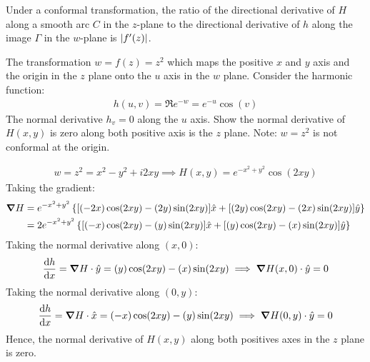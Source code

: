 \documentclass[12pt, english]{book}
\makeatletter
\renewenvironment{proof}[1][\proofname]{\par
	\pushQED{\qed}%
	\normalfont \topsep6\p@\@plus6\p@\relax
	\list{}{%
		\settowidth{\leftmargin}{\itshape\proofname:\hskip\labelsep}%
		\setlength{\labelwidth}{0pt}%
		\setlength{\itemindent}{-\leftmargin}%
		}%
	\item[\hskip\labelsep\itshape#1\@addpunct{:}]\ignorespaces
	}{\popQED\endlist\@endpefalse}
\makeatother
\begin{document}
	Under a conformal transformation, the ratio of the directional derivative of \(H\) along a smooth arc \(C\) in the \(z\)-plane to the directional derivative of \(h\) along the image \(\Gamma\) in the \(w\)-plane is \(\abs{f'(z)}\).
	
	\begin{example}
		The transformation \(w = f(z) = z^2\) which maps the positive \(x\) and \(y\) axis and the origin in the \(z\) plane onto the \(u\) axis in the \(w\) plane. Consider the harmonic function: 
		\begin{align*}
			h(u,v) = \Re{e^{-w}} = e^{-u} \cos(v)
		\end{align*}
		The normal derivative \(h_v = 0\) along the \(u\) axis. Show the normal derivative of \(H(x,y)\) is zero along both positive axis is the \(z\) plane. Note: \(w = z^2\) is not conformal at the origin.
		\begin{proof}
			{\color{Grey}
			\begin{align*}
				w = z^2 = x^2 - y^2 + i2xy 
				\implies H(x,y) = e^{-x^2 + y^2} \cos(2xy)
			\end{align*}
			Taking the gradient:
			\begin{align*}
				\grad{H} 
				&= e^{-x^2 + y^2} 
				\left\{ [(-2x)\cos(2xy) - (2y)\sin(2xy)]\hat{x} 
				+ [(2y)\cos(2xy) - (2x)\sin(2xy)] \hat{y} \right\} \\
				&= 2 e^{-x^2 + y^2} 
				\left\{ [(-x)\cos(2xy) - (y)\sin(2xy)]\hat{x} 
				+ [(y)\cos(2xy) - (x)\sin(2xy)] \hat{y} \right\}
			\end{align*}
			Taking the normal derivative along \((x,0)\):
			\begin{align*}
				\dv{h}{x} 
				= \grad{H} \cdot \hat{y} 
				= (y)\cos(2xy) - (x)\sin(2xy)
				\implies \grad{H}(x,0) \cdot \hat{y} = 0
			\end{align*}
			Taking the normal derivative along \((0,y)\):
			\begin{align*}
				\dv{h}{x} 
				= \grad{H} \cdot \hat{x} 
				= (-x)\cos(2xy) - (y)\sin(2xy)
				\implies \grad{H}(0, y) \cdot \hat{y} = 0
			\end{align*}
			Hence, the normal derivative of \(H(x,y)\) along both positives axes in the \(z\) plane is zero.
			}
		\end{proof}
	\end{example}
\end{document}
